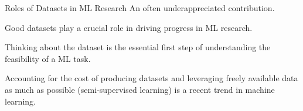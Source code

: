 \begin{frame}[allowframebreaks]

\begin{myconceptblock}{3.22}{Roles of Datasets in ML Research}
    An often underappreciated contribution.

    Good datasets play a crucial role in driving progress in ML research.

    Thinking about the dataset is the essential first step of understanding the feasibility of a ML task.

    Accounting for the cost of producing datasets and leveraging freely available data as much as possible (semi-supervised learning) is a recent trend in machine learning.
\end{myconceptblock}

\end{frame}
